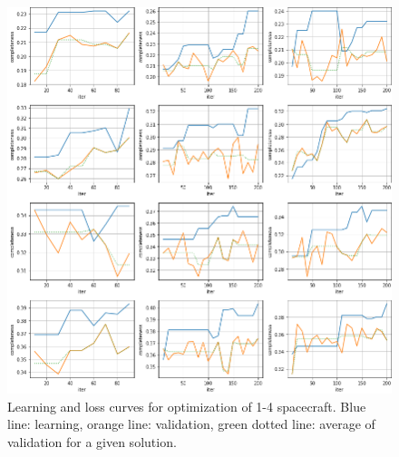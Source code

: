 \begin{figure}[p]
 \centering
 \includegraphics[width=1.0\textwidth]{img/appendix_loss_1.png}
 \caption{Learning and loss curves for optimization of 1-4 spacecraft. Blue line: learning, orange line: validation, green dotted line: average of validation for a given solution.}
\end{figure}



